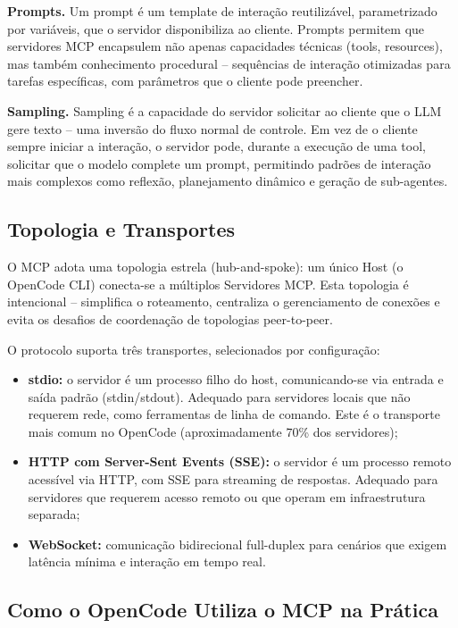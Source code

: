 \documentclass[12pt,a4paper,sumario=tradicional,openany]{abntex2}
\begin{document}
\textbf{Prompts.} Um prompt é um template de interação reutilizável, parametrizado por variáveis, que o servidor disponibiliza ao cliente. Prompts permitem que servidores MCP encapsulem não apenas capacidades técnicas (tools, resources), mas também conhecimento procedural -- sequências de interação otimizadas para tarefas específicas, com parâmetros que o cliente pode preencher.

\textbf{Sampling.} Sampling é a capacidade do servidor solicitar ao cliente que o LLM gere texto -- uma inversão do fluxo normal de controle. Em vez de o cliente sempre iniciar a interação, o servidor pode, durante a execução de uma tool, solicitar que o modelo complete um prompt, permitindo padrões de interação mais complexos como reflexão, planejamento dinâmico e geração de sub-agentes.

\subsection{Topologia e Transportes}

O MCP adota uma topologia estrela (hub-and-spoke): um único Host (o OpenCode CLI) conecta-se a múltiplos Servidores MCP. Esta topologia é intencional -- simplifica o roteamento, centraliza o gerenciamento de conexões e evita os desafios de coordenação de topologias peer-to-peer.

O protocolo suporta três transportes, selecionados por configuração:

\begin{itemize}
    \item \textbf{stdio:} o servidor é um processo filho do host, comunicando-se via entrada e saída padrão (stdin/stdout). Adequado para servidores locais que não requerem rede, como ferramentas de linha de comando. Este é o transporte mais comum no OpenCode (aproximadamente 70\% dos servidores);
    \item \textbf{HTTP com Server-Sent Events (SSE):} o servidor é um processo remoto acessível via HTTP, com SSE para streaming de respostas. Adequado para servidores que requerem acesso remoto ou que operam em infraestrutura separada;
    \item \textbf{WebSocket:} comunicação bidirecional full-duplex para cenários que exigem latência mínima e interação em tempo real.
\end{itemize}

\subsection{Como o OpenCode Utiliza o MCP na Prática}
\end{document}
